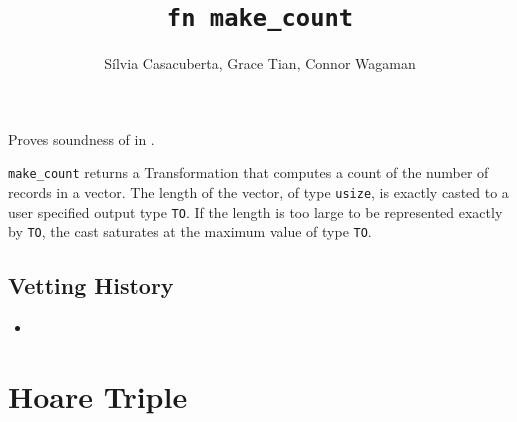 \documentclass{article}
\title{\texttt{fn make\_count}}
\author{S\'ilvia Casacuberta, Grace Tian, Connor Wagaman}
\date{}
\begin{document}
\maketitle

\contrib
Proves soundness of  in .

\texttt{make\_count} returns a Transformation that computes a count of the number of records in a vector.
The length of the vector, of type \texttt{usize}, is exactly casted to a user specified output type \texttt{TO}.
If the length is too large to be represented exactly by \texttt{TO}, 
the cast saturates at the maximum value of type \texttt{TO}.

\subsection*{Vetting History}
\begin{itemize}
    \item {}
\end{itemize}

\section{Hoare Triple}
\end{document}
